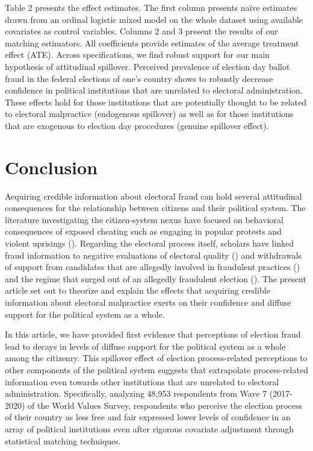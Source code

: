 \documentclass[11pt, ngerman,english,a4]{article}
\begin{document}
Table 2 presents the effect estimates. The first column presents na{\"i}ve estimates drawn from an ordinal logistic mixed model on the whole dataset using available covariates as control variables. Columns 2 and 3 present the results of our matching estimators. All coefficients provide estimates of the average treatment effect (ATE). Across specifications, we find robust support for our main hypothesis of attitudinal spillover. Perceived prevalence of election day ballot fraud in the federal elections of one’s country shows to robustly decrease confidence in political institutions that are unrelated to electoral administration. These effects hold for those institutions that are potentially thought to be related to electoral malpractice (endogenous spillover) as well as for those institutions that are exogenous to election day procedures (genuine spillover effect). 

\section*{Conclusion}

Acquiring credible information about electoral fraud can hold several attitudinal consequences for the relationship between citizens and their political system. The literature investigating the citizen-system nexus have focused on behavioral consequences of exposed cheating such as engaging in popular protests and violent uprisings (\citealt{Daxecker2012}). Regarding the electoral process itself, scholars have linked fraud information to negative evaluations of electoral quality (\citealt{Robertson2017}) and withdrawals of support from candidates that are allegedly involved in fraudulent practices (\citealt{Reuter2019}) and the regime that surged out of an allegedly fraudulent election (\citealt{Williamson2020}). The present article set out to theorize and explain the effects that acquiring credible information about electoral malpractice exerts on their confidence and diffuse support for the political system as a whole. 

In this article, we have provided first evidence that perceptions of election fraud lead to decays in levels of diffuse support for the political system as a whole among the citizenry. This spillover effect of election process-related perceptions to other components of the political system suggests that extrapolate process-related information even towards other institutions that are unrelated to electoral administration. Specifically, analyzing 48,953 respondents from Wave 7 (2017-2020) of the World Values Survey, respondents who perceive the election process of their country as less free and fair expressed lower levels of confidence in an array of political institutions even after rigorous covariate adjustment through statistical matching techniques. 
\end{document}

